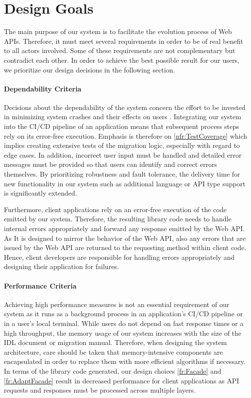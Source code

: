 \section{Design Goals}
\label{sec:DesignGoals}

The main purpose of our system is to facilitate the evolution process of Web APIs. Therefore, it must meet several requirements in order to be of real benefit to all actors involved. Some of these requirements are not complementary but contradict each other. In order to achieve the best possible result for our users, we prioritize our design decisions in the following section.

\paragraph{Dependability Criteria}
Decisions about the dependability of the system concern the effort to be invested in minimizing system crashes and their effects on users \cite{bruegge_object-oriented_2010}. Integrating our system into the CI/CD pipeline of an application means that subsequent process steps rely on its error-free execution. Emphasis is therefore on \ref{nfr:TestCoverage} which implies creating extensive tests of the migration logic, especially with regard to edge cases. In addition, incorrect user input must be handled and detailed error messages must be provided so that users can identify and correct errors themselves. By prioritizing robustness and fault tolerance, the delivery time for new functionality in our system such as additional language or API type support is significantly extended. 

Furthermore, client applications rely on an error-free execution of the code emitted by our system. Therefore, the resulting library code needs to handle internal errors appropriately and forward any response emitted by the Web API.  As It is designed to mirror the behavior of the Web API, also any errors that are issued by the Web API are returned to the requesting method within client code. Hence, client developers are responsible for handling errors appropriately and designing their application for failures. 

\paragraph{Performance Criteria}
Achieving high performance measures is not an essential requirement of our system as it runs as a background process in an application's CI/CD pipeline or in a user's local terminal. While users do not depend on fast response times or a high throughput, the memory usage of our system increases with the size of the IDL document or migration manual. Therefore, when designing the system architecture, care should be taken that memory-intensive components are encapsulated in order to replace them with more efficient algorithms if necessary. In terms of the library code generated, our design choices \ref{fr:Facade} and \ref{fr:AdaptFacade} result in decreased performance for client applications as API requests and responses must be processed across multiple layers.

